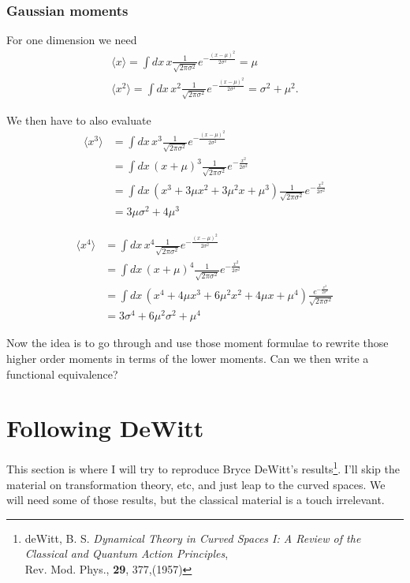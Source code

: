 \subsubsection{Gaussian moments}

For one dimension we need 
\begin{gather}
\langle x \rangle = \int dx\,x \frac{1}{\sqrt{2\pi\sigma^2}}e^{-\frac{(x-\mu)^2}{2\sigma^2}} = \mu\\
\langle x^2 \rangle = \int dx\,x^2 \frac{1}{\sqrt{2\pi\sigma^2}}e^{-\frac{(x-\mu)^2}{2\sigma^2}} = \sigma^2 + \mu^2.
\end{gather}

We then have to also evaluate 
\begin{align}
\langle x^3\rangle & = \int dx\, x^3 \frac{1}{\sqrt{2\pi\sigma^2}}e^{-\frac{(x-\mu)^2}{2\sigma^2}} \\
& = \int dx\, (x+\mu)^3 \frac{1}{\sqrt{2\pi\sigma^2}}e^{-\frac{x^2}{2\sigma^2}} \\
& = \int dx\, (x^3 + 3\mu x^2 + 3\mu^2 x + \mu^3 )\frac{1}{\sqrt{2\pi\sigma^2}}e^{-\frac{x^2}{2\sigma^2}} \\
& = 3\mu\sigma^2 + 4\mu^3
\end{align}

\begin{align}
\langle x^4\rangle & = \int dx\, x^4\frac{1}{\sqrt{2\pi\sigma^2}}e^{-\frac{(x-\mu)^2}{2\sigma^2}} \\
& = \int dx\, (x+\mu)^4 \frac{1}{\sqrt{2\pi\sigma^2}}e^{-\frac{x^2}{2\sigma^2}} \\
& = \int dx\, (x^4 + 4\mu x^3 + 6\mu^2 x^2 + 4\mu x + \mu^4 )\frac{e^{-\frac{x^2}{2\sigma^2}}}{\sqrt{2\pi\sigma^2}} \\
& = 3\sigma^4 + 6\mu^2 \sigma^2  + \mu^4 
\end{align}

Now the idea is to go through and use those moment formulae to rewrite those higher order moments in terms of the lower moments.
  Can we then write a functional equivalence?  


\section{Following DeWitt}

This section is where I will try to reproduce Bryce DeWitt's results\footnote{deWitt, B. S. \textit{Dynamical Theory in Curved Spaces I: A Review of the Classical and Quantum Action Principles}, \\{Rev. Mod. Phys.}, \textbf{29}, 377,(1957)}.  I'll skip the material on transformation theory, etc, and just leap to the curved spaces.  We will need some of those results, but the classical material is a touch irrelevant.  
